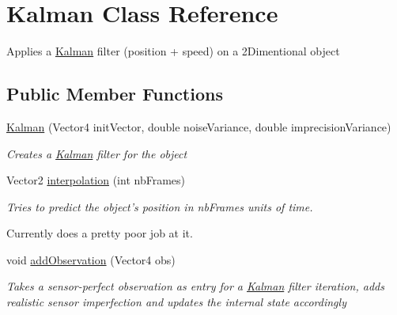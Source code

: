 \hypertarget{class_kalman}{\section{Kalman Class Reference}
\label{class_kalman}
}


Applies a \hyperlink{class_kalman}{Kalman} filter (position + speed) on a 2\-Dimentional object  


\subsection*{Public Member Functions}
\begin{DoxyCompactItemize}
\item 
\hyperlink{class_kalman_a63b79b011d0e7dc543204856c0dfa302}{Kalman} (Vector4 init\-Vector, double noise\-Variance, double imprecision\-Variance)
\begin{DoxyCompactList}\small\item\em Creates a \hyperlink{class_kalman}{Kalman} filter for the object \end{DoxyCompactList}\item 
Vector2 \hyperlink{class_kalman_a159b7586f0a79a2837f20d8baa9db302}{interpolation} (int nb\-Frames)
\begin{DoxyCompactList}\small\item\em Tries to predict the object's position in nb\-Frames units of time.\par
 Currently does a pretty poor job at it. \end{DoxyCompactList}\item 
void \hyperlink{class_kalman_a761d50207689b40a0ff6ca95f924f9f0}{add\-Observation} (Vector4 obs)
\begin{DoxyCompactList}\small\item\em Takes a sensor-\/perfect observation as entry for a \hyperlink{class_kalman}{Kalman} filter iteration, adds realistic sensor imperfection and updates the internal state accordingly \end{DoxyCompactList}\end{DoxyCompactItemize}
